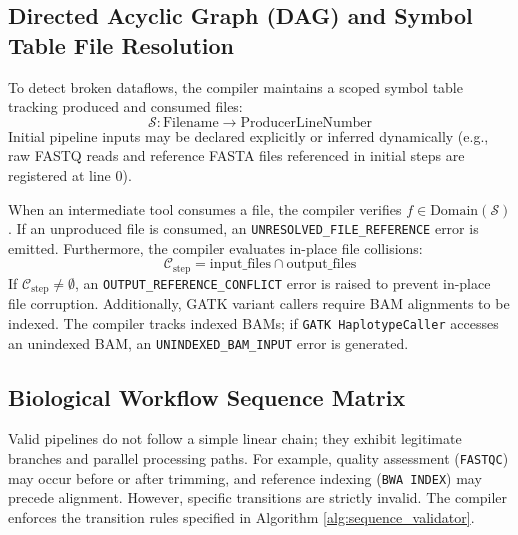 \documentclass[12pt,a4paper]{article}
\begin{document}
\subsection{Directed Acyclic Graph (DAG) and Symbol Table File Resolution}

To detect broken dataflows, the compiler maintains a scoped symbol table tracking produced and consumed files:
\begin{equation}
    \mathcal{S} : \text{Filename} \rightarrow \text{ProducerLineNumber}
\end{equation}
Initial pipeline inputs may be declared explicitly or inferred dynamically (e.g., raw FASTQ reads and reference FASTA files referenced in initial steps are registered at line $0$).

When an intermediate tool consumes a file, the compiler verifies $f \in \text{Domain}(\mathcal{S})$. If an unproduced file is consumed, an \texttt{UNRESOLVED\_FILE\_REFERENCE} error is emitted. Furthermore, the compiler evaluates in-place file collisions:
\begin{equation}
    \mathcal{C}_{\text{step}} = \text{input\_files} \cap \text{output\_files}
\end{equation}
If $\mathcal{C}_{\text{step}} \neq \emptyset$, an \texttt{OUTPUT\_REFERENCE\_CONFLICT} error is raised to prevent in-place file corruption. Additionally, GATK variant callers require BAM alignments to be indexed. The compiler tracks indexed BAMs; if \texttt{GATK HaplotypeCaller} accesses an unindexed BAM, an \texttt{UNINDEXED\_BAM\_INPUT} error is generated.

\subsection{Biological Workflow Sequence Matrix}

Valid pipelines do not follow a simple linear chain; they exhibit legitimate branches and parallel processing paths. For example, quality assessment (\texttt{FASTQC}) may occur before or after trimming, and reference indexing (\texttt{BWA INDEX}) may precede alignment. However, specific transitions are strictly invalid. The compiler enforces the transition rules specified in Algorithm \ref{alg:sequence_validator}.
\end{document}
